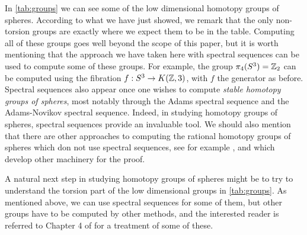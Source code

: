 \documentclass[../main.tex]{subfiles}
\begin{document}
In \cref{tab:groups} we can see some of the low dimensional homotopy groups
of spheres. According to what we have just showed, we remark that the
only non-torsion groups are exactly where we expect them to be in
the table.
Computing
all of these groups goes well beyond the scope of this paper, but it
is worth mentioning that the approach we have taken here with spectral
sequences can be used to compute some of these groups. For example,
the group \( \pi_4(S^3)=\mathbb{Z}_2 \) can be computed using the fibration
\( f:S^3\rightarrow K(\mathbb{Z}, 3) \), with \( f \) the generator as before.
Spectral sequences also appear once one wishes to compute \emph{stable
homotopy groups of spheres}, most notably through the Adams spectral
sequence and the Adams-Novikov spectral sequence. Indeed, in studying
homotopy groups of spheres, spectral sequences provide an invaluable
tool. We should also mention that there are other approaches to computing the rational homotopy
groups of spheres which don not use spectral sequences,
see for example \cite[]{KlMa04}, and which develop other machinery for
the proof. 

A natural next step in studying homotopy groups of spheres might
be to try to understand the torsion part of the low dimensional groups
in \cref{tab:groups}. As mentioned above, we can use spectral sequences
for some of them, but other groups have to be computed by other
methods, and the interested reader is referred to Chapter 4 of
\cite[]{Hat02} for a treatment of some of these.
\end{document}
